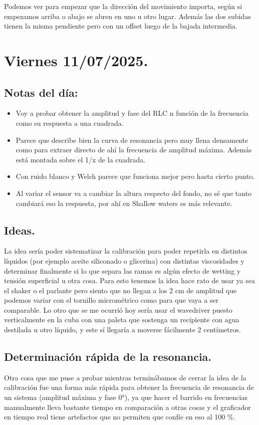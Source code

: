 Podemos ver para empezar que la dirección del movimiento importa, según si empezamos arriba o abajo se abren en uno u otro lugar. Además las dos subidas tienen la misma pendiente pero con un offset luego de la bajada intermedia. 




\section{Viernes 11/07/2025.} 
\subsection*{Notas del día:}
\begin{itemize}
	\item Voy a probar obtener la amplitud y fase del RLC n función de la frecuencia como su respuesta a una cuadrada. 
	\item Parece que describe bien la curva de resonancia pero muy llena densamente como para extraer directo de ahí la frecuencia de amplitud máxima. Además está montada sobre el 1/x de la cuadrada. 
	
	\item Con ruido blanco y Welch parece que funciona mejor pero hasta cierto punto.  
	
	\item Al variar el sensor va a cambiar la altura respecto del fondo, no sé que tanto cambiará eso la respuesta, por ahí en Shallow waters es más relevante. 
	
\end{itemize}
\subsection*{Ideas.}
La idea sería poder sistematizar la calibración para poder repetirla en distintos líquidos (por ejemplo aceite siliconado o glicerina) con distintas viscosidades y determinar finalmente si lo que separa las ramas es algún efecto de wetting y tensión superficial u otra cosa. Para esto tenemos la idea hace rato de usar ya sea el shaker o el parlante pero siento que no llegan a los 2 cm de amplitud que podemos variar con el tornillo micrométrico como para que vaya a ser comparable. Lo otro que se me ocurrió hoy sería usar el wavedriver puesto verticalmente en la cuba con una paleta que sostenga un recipiente con agua destilada u otro líquido, y este sí llegaría a moverse fácilmente 2 centímetros. %

\subsection*{Determinación rápida de la resonancia.} 
Otra cosa que me puse a probar mientras terminábamos de cerrar la idea de la calibración fue una forma más rápida para obtener la frecuencia de resonancia de un sistema (amplitud máxima y fase 0°), ya que hacer el barrido en frecuencias manualmente lleva bastante tiempo en comparación a otras cosas y el graficador en tiempo real tiene artefactos que no permiten que confíe en eso al 100 \%. 

